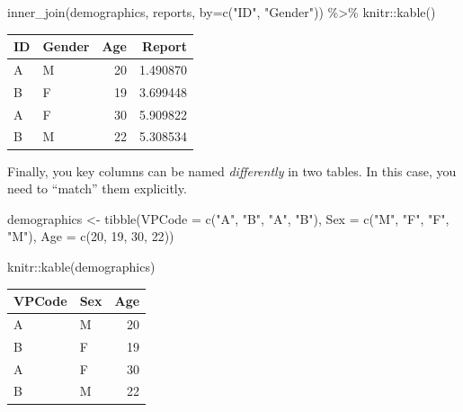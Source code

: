 \documentclass[
]{book}
\newenvironment{Shaded}{\begin{snugshade}}{\end{snugshade}}
\newcommand{\AttributeTok}[1]{\textcolor[rgb]{0.77,0.63,0.00}{#1}}
\newcommand{\DecValTok}[1]{\textcolor[rgb]{0.00,0.00,0.81}{#1}}
\newcommand{\FunctionTok}[1]{\textcolor[rgb]{0.00,0.00,0.00}{#1}}
\newcommand{\NormalTok}[1]{#1}
\newcommand{\OtherTok}[1]{\textcolor[rgb]{0.56,0.35,0.01}{#1}}
\newcommand{\SpecialCharTok}[1]{\textcolor[rgb]{0.00,0.00,0.00}{#1}}
\newcommand{\StringTok}[1]{\textcolor[rgb]{0.31,0.60,0.02}{#1}}
\begin{document}
\begin{Shaded}
\begin{Highlighting}[]
\FunctionTok{inner\_join}\NormalTok{(demographics, reports, }\AttributeTok{by=}\FunctionTok{c}\NormalTok{(}\StringTok{"ID"}\NormalTok{, }\StringTok{"Gender"}\NormalTok{)) }\SpecialCharTok{\%\textgreater{}\%}
\NormalTok{  knitr}\SpecialCharTok{::}\FunctionTok{kable}\NormalTok{()}
\end{Highlighting}
\end{Shaded}

\begin{tabular}{l|l|r|r}
\hline
ID & Gender & Age & Report\\
\hline
A & M & 20 & 1.490870\\
\hline
B & F & 19 & 3.699448\\
\hline
A & F & 30 & 5.909822\\
\hline
B & M & 22 & 5.308534\\
\hline
\end{tabular}

Finally, you key columns can be named \emph{differently} in two tables. In this case, you need to ``match'' them explicitly.

\begin{Shaded}
\begin{Highlighting}[]
\NormalTok{demographics }\OtherTok{\textless{}{-}} \FunctionTok{tibble}\NormalTok{(}\AttributeTok{VPCode =} \FunctionTok{c}\NormalTok{(}\StringTok{"A"}\NormalTok{, }\StringTok{"B"}\NormalTok{, }\StringTok{"A"}\NormalTok{, }\StringTok{"B"}\NormalTok{),}
                       \AttributeTok{Sex =} \FunctionTok{c}\NormalTok{(}\StringTok{"M"}\NormalTok{, }\StringTok{"F"}\NormalTok{, }\StringTok{"F"}\NormalTok{, }\StringTok{"M"}\NormalTok{),}
                       \AttributeTok{Age =} \FunctionTok{c}\NormalTok{(}\DecValTok{20}\NormalTok{, }\DecValTok{19}\NormalTok{, }\DecValTok{30}\NormalTok{, }\DecValTok{22}\NormalTok{))}

\NormalTok{knitr}\SpecialCharTok{::}\FunctionTok{kable}\NormalTok{(demographics)}
\end{Highlighting}
\end{Shaded}

\begin{tabular}{l|l|r}
\hline
VPCode & Sex & Age\\
\hline
A & M & 20\\
\hline
B & F & 19\\
\hline
A & F & 30\\
\hline
B & M & 22\\
\hline
\end{tabular}
\end{document}
